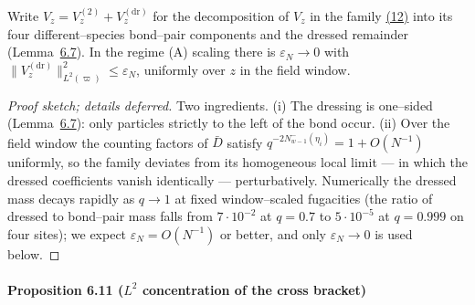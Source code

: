 \documentclass[11pt]{article}
\theoremstyle{plain}
\theoremstyle{definition}
\theoremstyle{remark}
\newcommand{\eps}{\varepsilon}\newcommand{\Exp}{\mathrm{Exp}}
\begin{document}
Write $V_z=V_z^{(2)}+V_z^{(\mathrm{dr})}$ for the decomposition of $V_z$ in the
family \hyperref[eq_orthexact]{(12)} into its four different--species bond--pair components
and the dressed remainder (Lemma~\hyperref[lem_orth]{6.7}). In the regime (A) scaling there is
$\eps_N\to0$ with $\|V^{(\mathrm{dr})}_z\|^2_{L^2(\varpi)}\le\eps_N$, uniformly over
$z$ in the field window.
\par
\begin{proof}[Proof sketch; details deferred]
Two ingredients. (i) The dressing is one--sided (Lemma~\hyperref[lem_orth]{6.7}): only
particles strictly to the left of the bond occur. (ii) Over the field window the
counting factors of $\bar D$ satisfy $q^{-2N^-_{w-1}(\eta_i)}=1+O(N^{-1})$
uniformly, so the family deviates from its homogeneous local limit --- in which the
dressed coefficients vanish identically --- perturbatively. Numerically the dressed
mass decays rapidly as $q\to1$ at fixed window--scaled fugacities (the ratio of
dressed to bond--pair mass falls from $7\cdot10^{-2}$ at $q=0.7$ to $5\cdot10^{-5}$
at $q=0.999$ on four sites); we expect $\eps_N=O(N^{-1})$ or better, and only
$\eps_N\to0$ is used below.
\end{proof}

\paragraph{Proposition 6.11 ($L^2$ concentration of the cross bracket)}\label{prop_conc}
\end{document}

